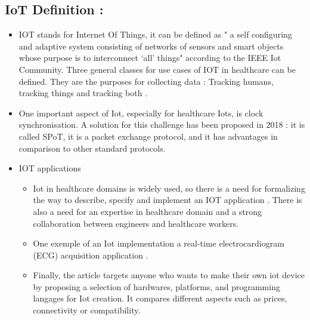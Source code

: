 \subsection{IoT Definition : }
  \begin{itemize}
  
      \item IOT stands for Internet Of Things, it can be defined as " a self configuring and adaptive system consisting 
      of networks of sensors and smart objects whose purpose is to interconnect ‘all’ things" 
      according to the IEEE Iot Community\cite{buildingIot}.
      Three general classes for use cases of IOT in healthcare can be defined. They are the purposes for  
      collecting data : Tracking humans, tracking things and tracking both \cite{buildingIot}.

      \item One important aspect of Iot, especially for healthcare Iots, is clock synchronisation. 
      A solution for this challenge has been proposed in 2018 \cite{clockIot}:
      it is called SPoT, it is a packet exchange protocol, and it has advantages in comparison to other standard protocols.

      \item IOT applications\newline
      \begin{itemize}
        \item Iot in healthcare domains is widely used, so there is a need for
        formalizing the way to describe, specify and implement an IOT application \cite{buildingIot}. 
        There is also a need for an expertise in healthcare domain and         
        a strong collaboration between engineers and healthcare workers.
        \item One exemple of an Iot implementation a real-time
        electrocardiogram (ECG) acquisition application \cite{ecgIot}.
        \item Finally, the article \cite{yourOwnIot} targets anyone 
        who wants to make their own iot device by proposing a selection of           
        hardwares, platforms, and programming langages for Iot creation. 
        It compares different aspects such as prices, connectivity or compatibility.
      \end{itemize}
  \end{itemize}




